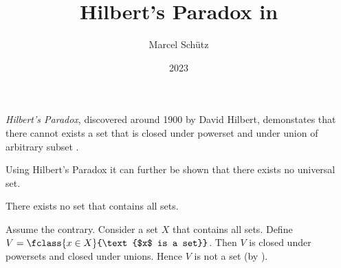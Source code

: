 \documentclass{stex}
\title{Hilbert's Paradox in \Naproche}
\author{Marcel Schütz}
\date{2023}
\begin{document}
\maketitle

\noindent \emph{Hilbert's Paradox}, discovered around 1900 by David Hilbert, demonstates that there cannot exists a set that is closed under powerset and under union of arbitrary subset \cite{PeckhausKahl2002}.


\noindent Using Hilbert's Paradox it can further be shown that there exists no universal set.

\begin{fcorollary*}
  There exists no set that contains all sets.
\end{fcorollary*}
\begin{fproof}[method=contradiction]
  Assume the contrary.
  Consider a set $X$ that contains all sets.
  Define $V = \fclass{x \in X}{\text{$x$ is a set}}$.
  Then $V$ is closed under powersets and closed under unions.
  Hence $V$ is not a set (by ).
\end{fproof}

\printbibliography
\end{document}
